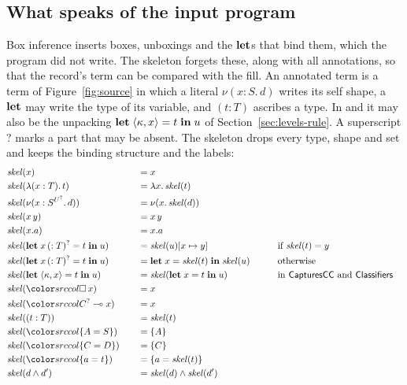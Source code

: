 \subsection{What speaks of the input program}\label{sec:fe-input}

Box inference inserts boxes, unboxings and the $\mathbf{let}$s that bind them, which the program did not write. The skeleton forgets these, along with all annotations, so that the record's term can be compared with the fill. An annotated term is a term of Figure~\ref{fig:source} in which a literal $\nu(x : S.\,d)$ writes its self shape, a $\mathbf{let}$ may write the type of its variable, and $(t : T)$ ascribes a type. In \treeCC and \treeCL it may also be the unpacking $\mathbf{let}\; \langle \kappa, x\rangle = t \;\mathbf{in}\; u$ of Section~\ref{sec:levels-rule}. A superscript $?$ marks a part that may be absent. The skeleton drops every type, shape and set and keeps the binding structure and the labels:
\begingroup
\color{srccol}
\allowdisplaybreaks
\begin{alignat*}{3}
& \mathit{skel}(x) &\quad& = x \\
& \mathit{skel}(\lambda(x : T).\,t) &\quad& = \lambda x.\,\mathit{skel}(t) \\
& \mathit{skel}(\nu(x : \capt{S}{U^{?}}.\,d)) &\quad& = \nu(x.\,\mathit{skel}(d)) \\
& \mathit{skel}(x\,y) &\quad& = x\,y \\
& \mathit{skel}(x.a) &\quad& = x.a \\
& \mathit{skel}(\klet x\,(: T)^{?} = t \kin u) &\quad& = \mathit{skel}(u)[x \mapsto y] &\qquad& \text{if } \mathit{skel}(t) = y \\
& \mathit{skel}(\klet x\,(: T)^{?} = t \kin u) &\quad& = \klet x = \mathit{skel}(t) \kin \mathit{skel}(u) &\qquad& \text{otherwise} \\
& \mathit{skel}(\klet \langle \kappa, x\rangle = t \kin u) &\quad& = \mathit{skel}(\klet x = t \kin u) &\qquad& \text{in \treeCC and \treeCL} \\
& \mathit{skel}(\dbox{x}) &\quad& = x \\
& \mathit{skel}(\dunbox{C^{?}}{x}) &\quad& = x \\
& \mathit{skel}((t : T)) &\quad& = \mathit{skel}(t) \\
& \mathit{skel}(\ddeftyp{A}{S}) &\quad& = \{A\} \\
& \mathit{skel}(\ddeftyp{C}{D}) &\quad& = \{C\} \\
& \mathit{skel}(\ddeftrm{a}{t}) &\quad& = \{a = \mathit{skel}(t)\} \\
& \mathit{skel}(d \wedge d') &\quad& = \mathit{skel}(d) \wedge \mathit{skel}(d')
\end{alignat*}
\endgroup

